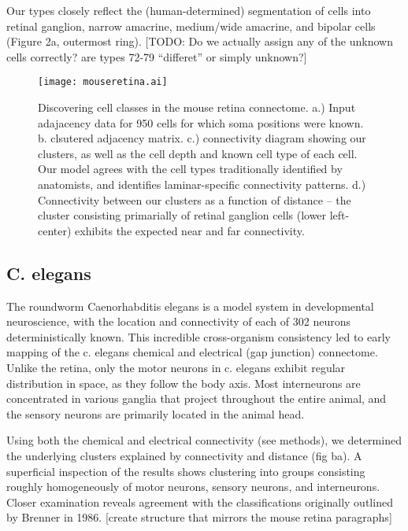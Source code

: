 \documentclass{article}
\begin{document}
Our types closely reflect the (human-determined) segmentation of cells
into retinal ganglion, narrow amacrine, medium/wide amacrine, and
bipolar cells (Figure 2a, outermost ring). [TODO: Do we actually
assign any of the unknown cells correctly? are types 72-79 “differet”
or simply unknown?]



\begin{figure}
  \centering 
  \centerline{\texttt{[image: mouseretina.ai]}}
  \caption{Discovering cell classes in the mouse retina connectome. 
a.) Input adajacency data for 950 cells for which soma positions were known. b. clsutered adjacency matrix. c.) connectivity diagram showing our clusters, as
well as the cell depth and known cell type of each cell. Our model agrees
with the cell types traditionally identified by anatomists, and identifies 
laminar-specific connectivity patterns. d.) Connectivity between our
clusters as a function of distance -- the cluster consisting primarially of
retinal ganglion cells (lower left-center) exhibits the expected near and
far connectivity.}
\end{figure}

\subsection{C. elegans}

The roundworm Caenorhabditis elegans is a model system in
developmental neuroscience\autocite{White1986}, with the location and
connectivity of each of 302 neurons deterministically known. This
incredible cross-organism consistency led to early mapping of the
c. elegans chemical and electrical (gap junction) connectome. Unlike
the retina, only the motor neurons in c. elegans exhibit regular
distribution in space, as they follow the body axis. Most interneurons
are concentrated in various ganglia that project throughout the entire
animal, and the sensory neurons are primarily located in the animal
head.

Using both the chemical and electrical connectivity (see methods), we
determined the underlying clusters explained by connectivity and
distance (fig ba). A superficial inspection of the results shows
clustering into groups consisting roughly homogeneously of motor
neurons, sensory neurons, and interneurons. Closer examination reveals
agreement with the classifications originally outlined by Brenner in
1986.  [create structure that mirrors the mouse retina paragraphs]
\end{document}
